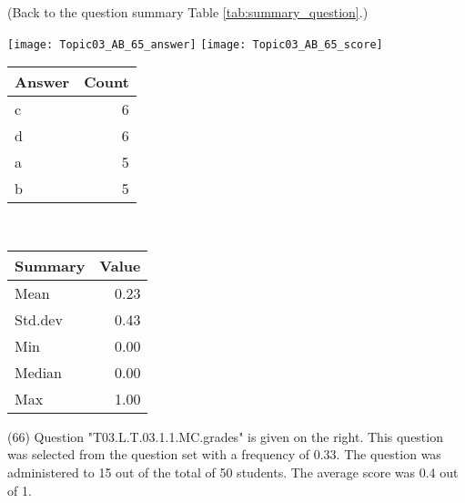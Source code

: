 \documentclass[12pt,english,nohyper]{tufte-handout}\usepackage[]{graphicx}\usepackage[]{color}
\begin{document}
 (Back to the question summary Table \ref{tab:summary_question}.)

\begin{center} \texttt{[image: Topic03\_AB\_65\_answer]} \texttt{[image: Topic03\_AB\_65\_score]} \end{center} 

\begin{center}%
\begin{tabular}{lr}
  \hline
Answer & Count \\ 
  \hline
c &   6 \\ 
  d &   6 \\ 
  a &   5 \\ 
  b &   5 \\ 
   \hline
\end{tabular}
~~~~~~~~%
\begin{tabular}{lr}
  \hline
Summary & Value \\ 
  \hline
Mean & 0.23 \\ 
  Std.dev & 0.43 \\ 
  Min & 0.00 \\ 
  Median & 0.00 \\ 
  Max & 1.00 \\ 
   \hline
\end{tabular}
\end{center}\newpage{} (66) Question "T03.L.T.03.1.1.MC.grades" is given on the right. This question was selected from the question set with a frequency of 0.33. The question was administered to 15 out of the total of 50 students. The average score was 0.4 out of 1.
\end{document}
